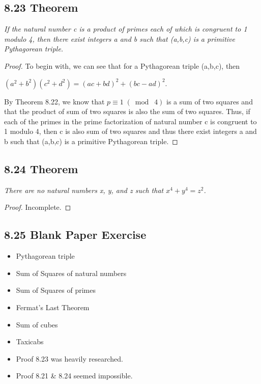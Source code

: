 \documentclass{article}
\begin{document}
\subsection*{8.23 Theorem} 
\quad \textit{If the natural number c is a product of primes each of which is congruent to 1 modulo 4, then there exist integers a and b such that (a,b,c) is a primitive Pythagorean triple.}

\begin{proof}
To begin with, we can see that for a Pythagorean triple (a,b,c), then
\begin{center}
    $(a^2 + b^2)(c^2 + d^2) = (ac + bd)^2 + (bc - ad)^2$.
\end{center}
By Theorem 8.22, we know that $p \equiv 1 \;(\bmod\; 4)$ is a sum of two squares and that the product of sum of two squares is also the sum of two squares. Thus, if each of the primes in  the prime factorization of natural number c is congruent to 1 modulo 4, then c is also sum of two squares and thus there exist integers a and b such that (a,b,c) is a primitive Pythagorean triple.
\end{proof}

\subsection*{8.24 Theorem} 
\quad \textit{There are no natural numbers x, y, and z such that $x^4 + y^4 = z^2$.}

\begin{proof}
Incomplete.
\end{proof}

\subsection*{8.25 Blank Paper Exercise} 
\begin{itemize}
    \item Pythagorean triple
    \item Sum of Squares of natural numbers
    \item Sum of Squares of primes
    \item Fermat's Last Theorem
    \item Sum of cubes
    \item Taxicabs
    \item Proof 8.23 was heavily researched.
    \item Proof 8.21 \& 8.24 seemed impossible.
\end{itemize}
\end{document}
